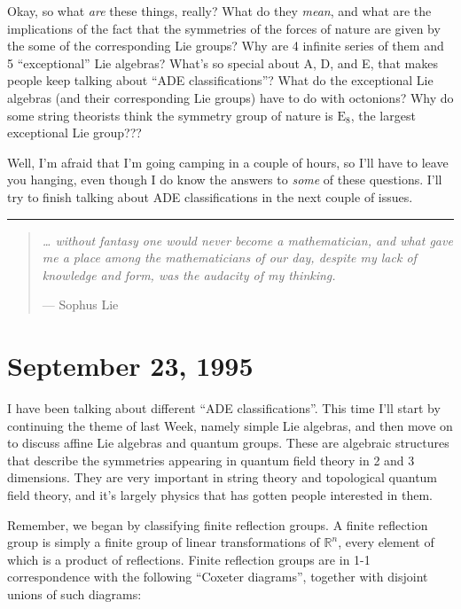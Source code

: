 \documentclass{article}
\begin{document}
Okay, so what \emph{are} these things, really? What do they \emph{mean},
and what are the implications of the fact that the symmetries of the
forces of nature are given by the some of the corresponding Lie groups?
Why are 4 infinite series of them and 5 ``exceptional'' Lie algebras?
What's so special about A, D, and E, that makes people keep talking
about ``ADE classifications''? What do the exceptional Lie algebras (and
their corresponding Lie groups) have to do with octonions? Why do some
string theorists think the symmetry group of nature is \(\mathrm{E}_8\),
the largest exceptional Lie group???

Well, I'm afraid that I'm going camping in a couple of hours, so I'll
have to leave you hanging, even though I do know the answers to
\emph{some} of these questions. I'll try to finish talking about ADE
classifications in the next couple of issues.

\begin{center}\rule{0.5\linewidth}{0.5pt}\end{center}

\begin{quote}
\emph{\ldots{} without fantasy one would never become a mathematician,
and what gave me a place among the mathematicians of our day, despite my
lack of knowledge and form, was the audacity of my thinking.}

--- Sophus Lie
\end{quote}



\hypertarget{week64}{%
\section{September 23, 1995}\label{week64}}

I have been talking about different ``ADE classifications''. This time
I'll start by continuing the theme of last Week, namely simple Lie
algebras, and then move on to discuss affine Lie algebras and quantum
groups. These are algebraic structures that describe the symmetries
appearing in quantum field theory in 2 and 3 dimensions. They are very
important in string theory and topological quantum field theory, and
it's largely physics that has gotten people interested in them.

Remember, we began by classifying finite reflection groups. A finite
reflection group is simply a finite group of linear transformations of
\(\mathbb{R}^n\), every element of which is a product of reflections.
Finite reflection groups are in 1-1 correspondence with the following
``Coxeter diagrams'', together with disjoint unions of such diagrams:
\end{document}
